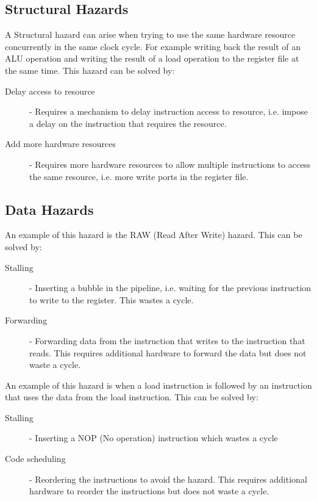 \documentclass[12pt letter]{report}
\begin{document}
\subsection{Structural Hazards}
A Structural hazard can arise when trying to use the same hardware resource concurrently in the same clock cycle. For example writing back the result of an
ALU operation and writing the result of a load operation to the register file at the same time.
This hazard can be solved by:
\begin{description}
  \item[Delay access to resource] - Requires a mechanism to delay instruction access to resource, i.e. impose a delay on the instruction that requires the resource.
  \item[Add more hardware resources] - Requires more hardware resources to allow multiple instructions to access the same resource, i.e. more write ports
        in the register file.
\end{description}

\subsection{Data Hazards}
An example of this hazard is the RAW (Read After Write) hazard. This can be solved by:
\begin{description}
  \item[Stalling]  - Inserting a bubble in the pipeline, i.e. waiting for the previous instruction to write to the register. This wastes a cycle.
  \item[Forwarding] - Forwarding data from the instruction that writes to the instruction that reads. This requires additional hardware to forward the data but
        does not waste a cycle.
\end{description}


An example of this hazard is when a load instruction is followed by an instruction that uses the data from the load instruction. This can be solved by:
\begin{description}
  \item[Stalling]  - Inserting a NOP (No operation) instruction which wastes a cycle
  \item[Code scheduling] - Reordering the instructions to avoid the hazard. This requires additional hardware to reorder the instructions but does not waste a cycle.
\end{description}
\end{document}
